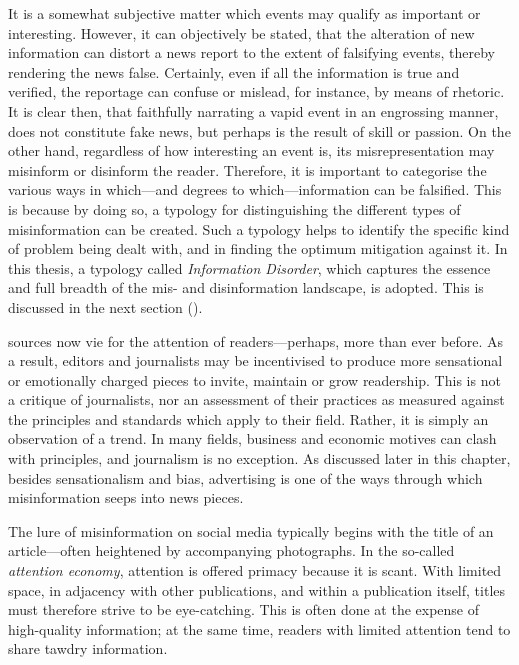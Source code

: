 It is a somewhat subjective matter which events may qualify as important or interesting. However, it can objectively be stated, that the alteration of new information can distort a news report to the extent of falsifying events, thereby rendering the news false. Certainly, even if all the information is true and verified, the reportage can confuse or mislead, for instance, by means of rhetoric. It is clear then, that faithfully narrating a vapid event in an engrossing manner, does not constitute fake news, but perhaps is the result of skill or passion. On the other hand, regardless of how interesting an event is, its misrepresentation may misinform or disinform the reader. Therefore, it is important to categorise the various ways in which—and degrees to which—information can be falsified. This is because by doing so, a typology for distinguishing the different types of misinformation can be created. Such a typology helps to identify the specific kind of problem being dealt with, and in finding the optimum mitigation against it. In this thesis, a typology called \emph{Information Disorder}, which captures the essence and full breadth of the mis- and disinformation landscape, is adopted. This is discussed in the next section ().

 sources now vie for the attention of readers—perhaps, more than ever before. As a result, editors and journalists may be incentivised to produce more sensational or emotionally charged pieces to invite, maintain or grow readership. This is not a critique of journalists, nor an assessment of their practices as measured against the principles and standards which apply to their field. Rather, it is simply an observation of a trend. In many fields, business and economic motives can clash with principles, and journalism is no exception. As discussed later in this chapter, besides sensationalism and bias, advertising is one of the ways through which misinformation seeps into news pieces.

The lure of misinformation on social media typically begins with the title of an article—often heightened by accompanying photographs. In the so-called \emph{attention economy}, attention is offered primacy because it is scant. With limited space, in adjacency with other publications, and within a publication itself, titles must therefore strive to be eye-catching. This is often done at the expense of high-quality information; at the same time, readers with limited attention tend to share tawdry information.

